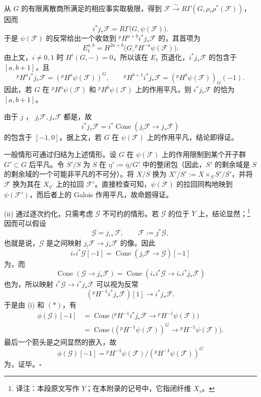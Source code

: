 从 $G$ 的有限离散商所满足的相应事实取极限，得到
$\mathcal F\xrightarrow{\sim}R\Gamma(G,\rho_*\rho^*(\mathcal F))$，因而
\[
i^*j_*\mathcal F=R\Gamma\bigl(G,\psi(\mathcal F)\bigr).
\]
于是 $\psi(\mathcal F)$ 的反常给出一个收敛到 ${}^pH^{a+b}i^*j_*\mathcal F$ 的，其首项为
\[
E_1^{a,b}=H^{2a+b}\bigl(G,{}^pH^{-a}\psi(\mathcal F)\bigr).
\]
由上文，$i\ne0,1$ 时 $H^i(G,-)=0$，所以该在 $E_1$ 页退化，$i^*j_*\mathcal F$ 的包含于 $[a,b+1]$，且
\begin{equation*}
\tag{$*$}
{}^pH^a i^*j_*\mathcal F=({}^pH^a\psi(\mathcal F))^G,
\qquad
{}^pH^{b+1}i^*j_*\mathcal F=({}^pH^b\psi(\mathcal F))_G(-1).
\end{equation*}
因此，若 $G$ 在 ${}^pH^a\psi(\mathcal F)$ 和 ${}^pH^b\psi(\mathcal F)$ 上的作用平凡，则 $i^*j_*\mathcal F$ 的恰为 $[a,b+1]$。

由于 $j$ ， $j_!\mathcal F,j_*\mathcal F$ 都是，故
\[
i^*j_*\mathcal F=i^*\operatorname{Cone}(j_!\mathcal F\to j_*\mathcal F)
\]
的包含于 $[-1,0]$。据上文，若 $G$ 在 $\psi(\mathcal F)$ 上的作用平凡，结论即得证。

一般情形可通过归结为上述情形。设 $G$ 在 $\psi(\mathcal F)$ 上的作用限制到某个开子群 $G'\subset G$ 后平凡。令 $S'/S$ 为 $S$ 在 $\eta':=\bar\eta/G'$ 中的整闭包（因此，$S'$ 的剩余域是 $S$ 的剩余域的一个可能非平凡的不可分）。将 $X/S$ 换为 $X'/S':=X\times_SS'/S'$，并将 $\mathcal F$ 换为其在 $X_{\eta'}$ 上的拉回 $\mathcal F'$。直接检查可知，$\psi(\mathcal F)$ 的拉回同构地映到 $\psi(\mathcal F')$，而后者上的 Galois 作用平凡，故命题得证。

(ii) 通过逐次约化，只需考虑 $\mathcal G$ 不可约的情形。若 $\mathcal G$ 的位于 $Y$ 上，结论显然；\footnote{译注：本段原文写作 $Y$；在本附录的记号中，它指闭纤维 $X_s$。} 因而可以假设
\[
\mathcal G=j_{!*}\mathcal F,\qquad\mathcal F:=j^*\mathcal G,
\]
也就是说，$\mathcal G$ 是之间映射 $j_!\mathcal F\to j_*\mathcal F$ 的像。因此
\[
i_*i^*\mathcal G[-1]=\operatorname{Cone}(j_!\mathcal F\to\mathcal G)[-1]
\]
为，而
\[
\operatorname{Cone}(\mathcal G\to j_*\mathcal F)
=\operatorname{Cone}(i_*i^*\mathcal G\to i_*i^*j_*\mathcal F)
\]
也为，所以映射 $i^*\mathcal G\to i^*j_*\mathcal F$ 可以视为反常
\[
({}^pH^{-1}i^*j_*\mathcal F)[1]\longrightarrow i^*j_*\mathcal F.
\]
于是由 (i) 和 $(*)$，有
\begin{align*}
\phi(\mathcal G)[-1]
&=\operatorname{Cone}\bigl({}^pH^{-1}i^*j_*\mathcal F\to{}^pH^{-1}\psi(\mathcal F)\bigr)\\
&=\operatorname{Cone}\bigl(({}^pH^{-1}\psi(\mathcal F))^G\to{}^pH^{-1}\psi(\mathcal F)\bigr).
\end{align*}
最后一个箭头是之间显然的嵌入，故
\[
\phi(\mathcal G)[-1]={}^pH^{-1}\psi(\mathcal F)/({}^pH^{-1}\psi(\mathcal F))^G
\]
为，证毕。\hfill$\square$


